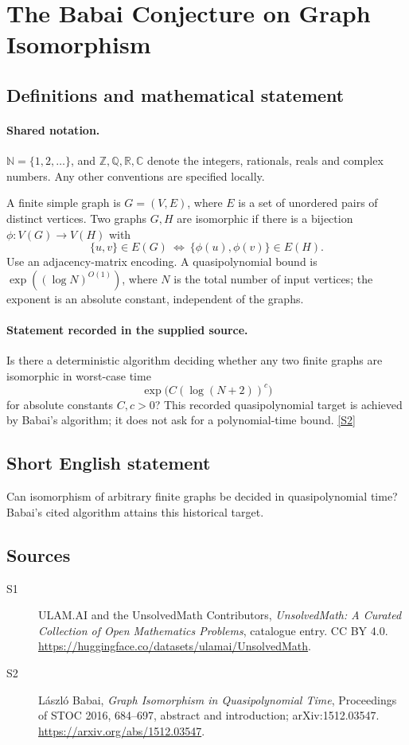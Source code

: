 \documentclass[11pt]{article}
\newcommand{\sref}[2]{\hyperlink{source:#1:#2}{[S#2]}}
\begin{document}
\section{The Babai Conjecture on Graph Isomorphism}\label{statement}

\subsection{Definitions and mathematical statement}

\paragraph{Shared notation.}$\mathbb N=\{1,2,\ldots\}$, and $\mathbb Z,\mathbb Q,\mathbb R,\mathbb C$ denote the integers, rationals, reals and complex numbers. Any other conventions are specified locally.


A finite simple graph is \(G=(V,E)\), where \(E\) is a set of
unordered pairs of distinct vertices.  Two graphs \(G,H\) are
isomorphic if there is a bijection \(\phi:V(G)\to V(H)\) with
\[
 \{u,v\}\in E(G)\ \Longleftrightarrow\
 \{\phi(u),\phi(v)\}\in E(H).
\]
Use an adjacency-matrix encoding.  A quasipolynomial bound is
\(\exp((\log N)^{O(1)})\), where \(N\) is the total number of input
vertices; the exponent is an absolute constant, independent of the graphs.
\paragraph{Statement recorded in the supplied source.}
Is there a deterministic algorithm deciding whether any two
finite graphs are isomorphic in worst-case time
\[
 \exp\bigl(C(\log(N+2))^c\bigr)
\]
for absolute constants \(C,c>0\)?
This recorded quasipolynomial target is achieved by Babai's algorithm;
it does not ask for a polynomial-time bound. \sref{statement}{2}
\subsection{Short English statement}
Can isomorphism of arbitrary finite graphs be decided in quasipolynomial time? Babai's cited algorithm attains this historical target.
\subsection{Sources}
\begin{description}
\item[\hypertarget{source:statement:1}{S1}] ULAM.AI and the UnsolvedMath Contributors, \emph{UnsolvedMath: A Curated Collection of Open Mathematics Problems}, catalogue entry. CC BY 4.0. \url{https://huggingface.co/datasets/ulamai/UnsolvedMath}.
\item[\hypertarget{source:statement:2}{S2}] L\'aszl\'o Babai, \emph{Graph Isomorphism in Quasipolynomial Time}, Proceedings of STOC 2016, 684--697, abstract and introduction; arXiv:1512.03547. \url{https://arxiv.org/abs/1512.03547}.
\end{description}
\label{end:statement}
\end{document}
